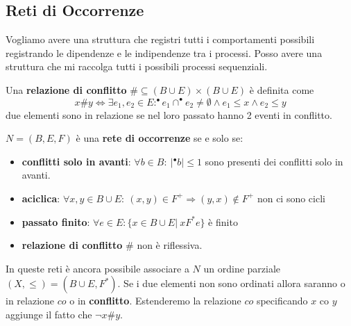 \subsection{Reti di Occorrenze}
Vogliamo avere una struttura che registri tutti i comportamenti possibili
registrando le dipendenze e le indipendenze tra i processi. Posso avere una
struttura che mi raccolga tutti i possibili processi sequenziali.
\begin{definizione}
    Una \textbf{relazione di conflitto}  $\#\subseteq (B\cup E)\times (B\cup E)$
    è definita come
    \begin{equation}
        x\#y\iff \exists e_1,e_2\in E :^{\bullet}e_1 \cap ^{\bullet} e_2\ne \emptyset
        \land e_1\le x \land e_2\le y
    \end{equation}
    due elementi sono in relazione se nel loro passato hanno 2 eventi in conflitto.
\end{definizione}
\begin{definizione}
    $N = (B, E, F)$ è una \textbf{rete di occorrenze} se e solo se:
    \begin{itemize}
        \item \textbf{conflitti solo in avanti}: $\forall b \in B: \ | ^{\bullet}b|
                  \leq 1$ sono presenti dei conflitti solo in avanti.
        \item \textbf{aciclica}: $\forall x, y \in B \cup E: \ (x, y) \in F^{+}
                  \Rightarrow (y, x) \notin F^{+}$
              non ci sono cicli
        \item\textbf{passato finito}: $\forall e \in E: \{x \in B \cup E| \
                  xF^{\ast} e \}$ è finito
        \item \textbf{relazione di conflitto} $\#$ non è riflessiva.
    \end{itemize}
\end{definizione}
In queste reti è ancora possibile associare a $N$ un ordine parziale
$(X, \leq) = (B \cup E, F^{\ast})$. Se i due elementi non sono ordinati allora
saranno o in relazione $co$ o in \textbf{conflitto}. Estenderemo la relazione $co$
specificando $x\text{ co }y$ aggiunge il fatto che $\lnot x\#y$.
